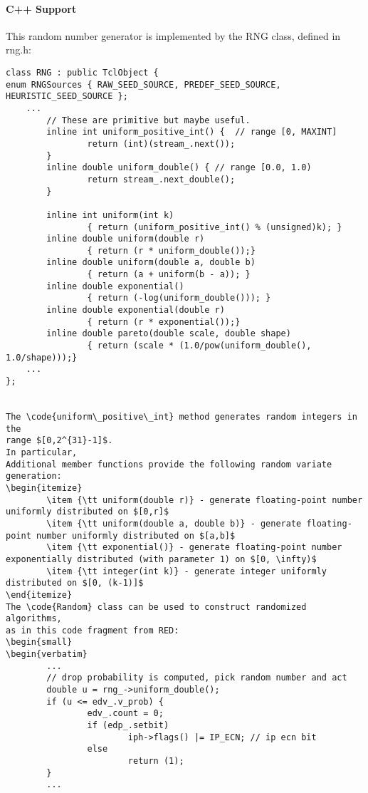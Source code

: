 \paragraph{C++ Support}
This random number generator is
implemented by the RNG class, defined in rng.h:
\begin{small}
\begin{verbatim}
class RNG : public TclObject {
enum RNGSources { RAW_SEED_SOURCE, PREDEF_SEED_SOURCE, HEURISTIC_SEED_SOURCE };
	...
        // These are primitive but maybe useful.
        inline int uniform_positive_int() {  // range [0, MAXINT]
                return (int)(stream_.next());
        }
        inline double uniform_double() { // range [0.0, 1.0)
                return stream_.next_double();
        }

        inline int uniform(int k)
                { return (uniform_positive_int() % (unsigned)k); }
        inline double uniform(double r) 
                { return (r * uniform_double());}
        inline double uniform(double a, double b)
                { return (a + uniform(b - a)); }
        inline double exponential()
                { return (-log(uniform_double())); }
        inline double exponential(double r)
                { return (r * exponential());}
        inline double pareto(double scale, double shape)
                { return (scale * (1.0/pow(uniform_double(), 1.0/shape)));}
	...
};


The \code{uniform\_positive\_int} method generates random integers in the
range $[0,2^{31}-1]$.
In particular,
Additional member functions provide the following random variate
generation:
\begin{itemize}
        \item {\tt uniform(double r)} - generate floating-point number uniformly distributed on $[0,r]$
        \item {\tt uniform(double a, double b)} - generate floating-point number uniformly distributed on $[a,b]$
        \item {\tt exponential()} - generate floating-point number exponentially distributed (with parameter 1) on $[0, \infty)$
        \item {\tt integer(int k)} - generate integer uniformly distributed on $[0, (k-1)]$
\end{itemize}
The \code{Random} class can be used to construct randomized algorithms,
as in this code fragment from RED:
\begin{small}
\begin{verbatim}
        ...
        // drop probability is computed, pick random number and act
        double u = rng_->uniform_double();
        if (u <= edv_.v_prob) {
                edv_.count = 0;
                if (edp_.setbit) 
                        iph->flags() |= IP_ECN; // ip ecn bit
                else
                        return (1);
        }
        ...
\end{verbatim}
\end{small}

